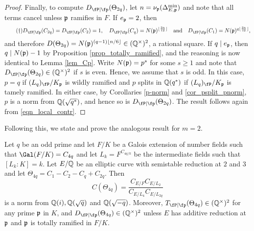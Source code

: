\begin{proof}
    Finally, to compute $\Dp(\Theta_{2q})$, let $n=\nu_{\mathfrak{p}}(\Delta_{E,\mathfrak{p}}^{\min})$ and note that all terms cancel unless $\mathfrak{p}$ ramifies in $F$. If $e_{\mathfrak{p}}=2$, then
    \begin{equation}\label{eqn_ep=2}\tag{\textdagger}
        \Dp(C_{2q})=\Dp(C_2)=1,\quad \Dp(C_q)=N(\pp)^{\floor{\frac{2n}{12}}}\quad\text{and}\quad \Dp(C_1)=N(\pp)^{q\floor{\frac{2n}{12}}},
    \end{equation}
    and therefore $D(\Theta_{2q})=N(\mathfrak{p})^{(q-1)\lfloor n/6\rfloor}\in(\mathbb{Q}^{\times})^2$, a rational square. If $q\mid e_{\mathfrak{p}}$, then $q\mid N(\mathfrak{p})-1$ by Proposition \ref{prop_totally_ramified}, and the reasoning is now identical to Lemma \ref{lem_Cp}. Write $N(\mathfrak{p})=p^s$ for some $s\geq1$ and note that $\Dp(\Theta_{2q})\in\QQss$ if $s$ is even. Hence, we assume that $s$ is odd. In this case, $p=q$ if $(L_q)_\fP/K_\pp$ is wildly ramified and $p$ splits in $\mathbb{Q}(q^*)$ if $(L_q)_\fP/K_\pp$ is tamely ramified. In either case, by Corollaries \ref{p-norm} and \ref{cor_psplit_pnorm}, $p$ is a norm from $\mathbb{Q}(\sqrt{q^*})$, and hence so is $\Dp(\Theta_{2q})$.
    The result follows again from \eqref{eqn_local_contr}.
\end{proof}

Following this, we state and prove the analogous result for $m=2$.

\begin{lemma}\label{lem_C4p}
    Let $q$ be an odd prime and let $F/K$ be a Galois extension of number fields such that $\Gal(F/K)=C_{4q}$ and let $L_k=F^{C_{4q/k}}$ be the intermediate fields such that $[L_k:K]=k$. Let $E/\mathbb{Q}$ be an elliptic curve with semistable reduction at $2$ and $3$ and let $\Theta_{4q}=C_1-C_2-C_q+C_{2q}$. Then 
    $$C(\Theta_{4q})=\frac{C_{E/F}C_{E/L_2}}{C_{E/L_4}C_{E/L_{2q}}}$$
    is a norm from $\mathbb{Q}(i),\mathbb{Q}(\sqrt{q})$ and $\mathbb{Q}(\sqrt{-q})$. Moreover, $\Tp(\Theta_{4q})\in\QQss$ for any prime $\mathfrak{p}$ in $K$, and $\Dp(\Theta_{4q})\in\QQss$ unless $E$ has additive reduction at $\mathfrak{p}$ and $\mathfrak{p}$ is totally ramified in $F/K$.
\end{lemma}

